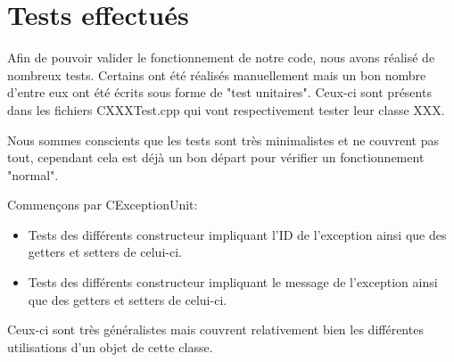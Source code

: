 	\chapter{Tests effectués}
		Afin de pouvoir valider le fonctionnement de notre code, nous avons réalisé de nombreux tests. Certains ont été réalisés manuellement mais un bon nombre d'entre eux ont été écrits sous forme de "test unitaires". Ceux-ci sont présents dans les fichiers CXXXTest.cpp qui vont respectivement tester leur classe XXX.
		
		Nous sommes conscients que les tests sont très minimalistes et ne couvrent pas tout, cependant cela est déjà un bon départ pour vérifier un fonctionnement "normal".
		
		Commençons par CExceptionUnit:
		\begin{itemize}
			\item Tests des différents constructeur impliquant l'ID de l'exception ainsi que des getters et setters de celui-ci.
			\item Tests des différents constructeur impliquant le message de l'exception ainsi que des getters et setters de celui-ci.\\
		\end{itemize}
		Ceux-ci sont très généralistes mais couvrent relativement bien les différentes utilisations d'un objet de cette classe.
		
